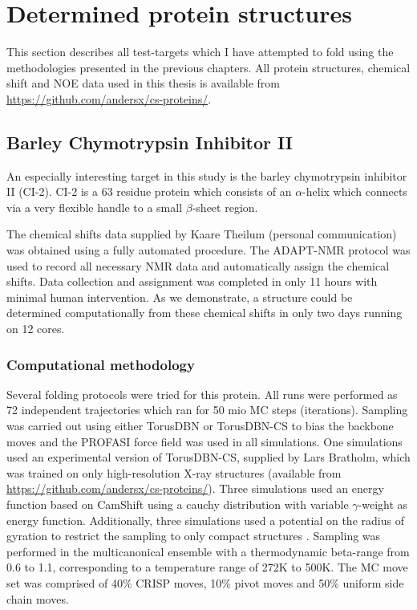 \chapter{Determined protein structures}
\label{chapter:results}
This section describes all test-targets which I have attempted to fold using the methodologies presented in the previous chapters.
All protein structures, chemical shift and NOE data used in this thesis is available from \url{https://github.com/andersx/cs-proteins/}.


\section{Barley Chymotrypsin Inhibitor II}

An especially interesting target in this study is the barley chymotrypsin inhibitor II (CI-2). CI-2 is a 63 residue protein which consists of an $\alpha$-helix which connects via a very flexible handle to a small $\beta$-sheet region.

The chemical shifts data supplied by Kaare Theilum (personal communication) was obtained using a fully automated procedure.
The ADAPT-NMR \cite{adaptnmr} protocol was used to record all necessary NMR data and automatically assign the chemical shifts.
Data collection and assignment was completed in only 11 hours with minimal human intervention.
As we demonstrate, a structure could be determined computationally from these chemical shifts in only two days running on 12 cores.



\subsection{Computational methodology}
Several folding protocols were tried for this protein. All runs were performed as 72 independent trajectories which ran for 50 mio MC steps (iterations).
Sampling was carried out using either TorusDBN or TorusDBN-CS to bias the backbone moves and the PROFASI force field was used in all simulations.
One simulations used an experimental version of TorusDBN-CS, supplied by Lars Bratholm, which was trained on only high-resolution X-ray structures (available from \url{https://github.com/andersx/cs-proteins/}).
Three simulations used an energy function based on CamShift using a cauchy distribution with variable $\gamma$-weight as energy function.
Additionally, three simulations used a potential on the radius of gyration to restrict the sampling to only compact structures \cite{Phaistos_oldest}.
Sampling was performed in the multicanonical ensemble with a thermodynamic beta-range from 0.6 to 1.1, corresponding to a temperature range of 272K to 500K. The MC move set was comprised of 40\% CRISP moves, 10\% pivot moves and 50\% uniform side chain moves.


